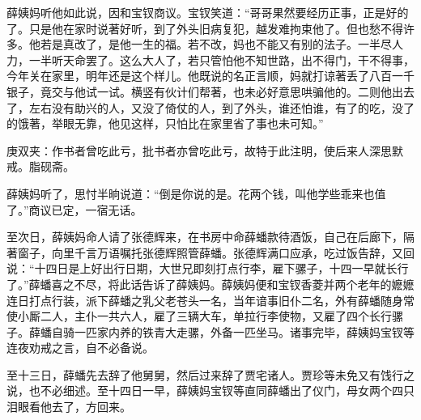 \begin{parag}
    薛姨妈听他如此说，因和宝钗商议。宝钗笑道：“哥哥果然要经历正事，正是好的了。只是他在家时说著好听，到了外头旧病复犯，越发难拘束他了。但也愁不得许多。他若是真改了，是他一生的福。若不改，妈也不能又有别的法子。一半尽人力，一半听天命罢了。这么大人了，若只管怕他不知世路，出不得门，干不得事，今年关在家里，明年还是这个样儿。他既说的名正言顺，妈就打谅著丢了八百一千银子，竟交与他试一试。横竖有伙计们帮著，也未必好意思哄骗他的。二则他出去了，左右没有助兴的人，又没了倚仗的人，到了外头，谁还怕谁，有了的吃，没了的饿著，举眼无靠，他见这样，只怕比在家里省了事也未可知。”\begin{note}庚双夹：作书者曾吃此亏，批书者亦曾吃此亏，故特于此注明，使后来人深思默戒。脂砚斋。\end{note}薛姨妈听了，思忖半晌说道：“倒是你说的是。花两个钱，叫他学些乖来也值了。”商议已定，一宿无话。
\end{parag}


\begin{parag}
    至次日，薛姨妈命人请了张德辉来，在书房中命薛蟠款待酒饭，自己在后廊下，隔著窗子，向里千言万语嘱托张德辉照管薛蟠。张德辉满口应承，吃过饭告辞，又回说：“十四日是上好出行日期，大世兄即刻打点行李，雇下骡子，十四一早就长行了。”薛蟠喜之不尽，将此话告诉了薛姨妈。薛姨妈便和宝钗香菱并两个老年的嬷嬷连日打点行装，派下薛蟠之乳父老苍头一名，当年谙事旧仆二名，外有薛蟠随身常使小厮二人，主仆一共六人，雇了三辆大车，单拉行李使物，又雇了四个长行骡子。薛蟠自骑一匹家内养的铁青大走骡，外备一匹坐马。诸事完毕，薛姨妈宝钗等连夜劝戒之言，自不必备说。
\end{parag}


\begin{parag}
    至十三日，薛蟠先去辞了他舅舅，然后过来辞了贾宅诸人。贾珍等未免又有饯行之说，也不必细述。至十四日一早，薛姨妈宝钗等直同薛蟠出了仪门，母女两个四只泪眼看他去了，方回来。
\end{parag}


